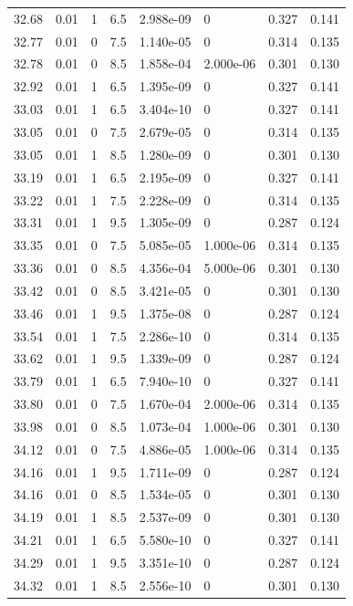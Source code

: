 \documentclass[preview]{standalone}
\begin{document}
{{{{{{{{{\begin{tabular}{L{1.2cm}C{1.2cm} C{0.3cm}C{0.5cm} C{1.4cm}C{1.4cm} C{1.4cm}C{1.4cm}}
  32.68  &  0.01  & 1     & 6.5 &  2.988e-09  & 0  & 0.327 &  0.141   \\ 
  32.77  &  0.01  & 0     & 7.5 &  1.140e-05  & 0  & 0.314 &  0.135   \\ 
  32.78  &  0.01  & 0     & 8.5 &  1.858e-04  & 2.000e-06  & 0.301 &  0.130   \\ 
  32.92  &  0.01  & 1     & 6.5 &  1.395e-09  & 0  & 0.327 &  0.141   \\ 
  33.03  &  0.01  & 1     & 6.5 &  3.404e-10  & 0  & 0.327 &  0.141   \\ 
  33.05  &  0.01  & 0     & 7.5 &  2.679e-05  & 0  & 0.314 &  0.135   \\ 
  33.05  &  0.01  & 1     & 8.5 &  1.280e-09  & 0  & 0.301 &  0.130   \\ 
  33.19  &  0.01  & 1     & 6.5 &  2.195e-09  & 0  & 0.327 &  0.141   \\ 
  33.22  &  0.01  & 1     & 7.5 &  2.228e-09  & 0  & 0.314 &  0.135   \\ 
  33.31  &  0.01  & 1     & 9.5 &  1.305e-09  & 0  & 0.287 &  0.124   \\ 
  33.35  &  0.01  & 0     & 7.5 &  5.085e-05  & 1.000e-06  & 0.314 &  0.135   \\ 
  33.36  &  0.01  & 0     & 8.5 &  4.356e-04  & 5.000e-06  & 0.301 &  0.130   \\ 
  33.42  &  0.01  & 0     & 8.5 &  3.421e-05  & 0  & 0.301 &  0.130   \\ 
  33.46  &  0.01  & 1     & 9.5 &  1.375e-08  & 0  & 0.287 &  0.124   \\ 
  33.54  &  0.01  & 1     & 7.5 &  2.286e-10  & 0  & 0.314 &  0.135   \\ 
  33.62  &  0.01  & 1     & 9.5 &  1.339e-09  & 0  & 0.287 &  0.124   \\ 
  33.79  &  0.01  & 1     & 6.5 &  7.940e-10  & 0  & 0.327 &  0.141   \\ 
  33.80  &  0.01  & 0     & 7.5 &  1.670e-04  & 2.000e-06  & 0.314 &  0.135   \\ 
  33.98  &  0.01  & 0     & 8.5 &  1.073e-04  & 1.000e-06  & 0.301 &  0.130   \\ 
  34.12  &  0.01  & 0     & 7.5 &  4.886e-05  & 1.000e-06  & 0.314 &  0.135   \\ 
  34.16  &  0.01  & 1     & 9.5 &  1.711e-09  & 0  & 0.287 &  0.124   \\ 
  34.16  &  0.01  & 0     & 8.5 &  1.534e-05  & 0  & 0.301 &  0.130   \\ 
  34.19  &  0.01  & 1     & 8.5 &  2.537e-09  & 0  & 0.301 &  0.130   \\ 
  34.21  &  0.01  & 1     & 6.5 &  5.580e-10  & 0  & 0.327 &  0.141   \\ 
  34.29  &  0.01  & 1     & 9.5 &  3.351e-10  & 0  & 0.287 &  0.124   \\ 
  34.32  &  0.01  & 1     & 8.5 &  2.556e-10  & 0  & 0.301 &  0.130   \\ 
\hline 
\end{tabular} 

}}}}}}}}}
\end{document}
